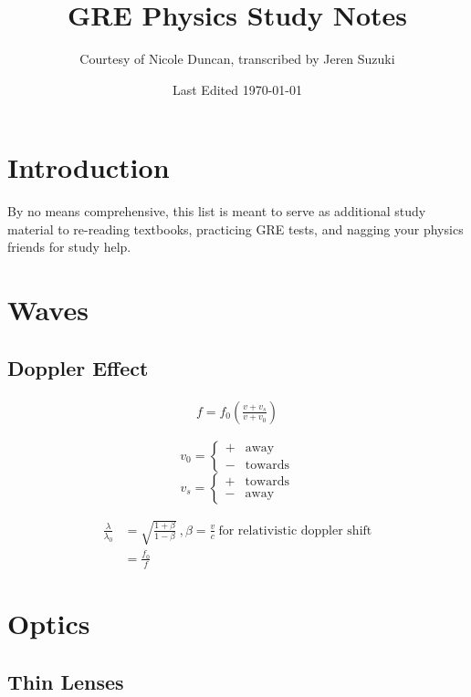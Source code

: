 \documentclass[10pt,letter]{article}
\title{GRE Physics Study Notes}
\author{Courtesy of Nicole Duncan, transcribed by Jeren Suzuki}
\date{Last Edited \today}
\begin{document}
\maketitle
{}
\newpage
\tableofcontents
\newpage
{}


\section*{Introduction}
By no means comprehensive, this list is meant to serve as additional study material to re-reading textbooks, practicing GRE tests, and nagging your physics friends for study help.


\section{Waves}
\subsection{Doppler Effect}

\begin{align}
    f = f_0 \left( \frac{v + v_s}{v + v_0} \right)
\end{align}

\[
 v_0 =
  \begin{cases}
   + & \textrm{away} \\
   - & \textrm{towards}
  \end{cases}
\]
\[
 v_s =
  \begin{cases}
   + & \textrm{towards} \\
   - & \textrm{away}
  \end{cases}
\]

\begin{align}
\frac{\lambda}{\lambda_0} &= \sqrt{\frac{1+\beta}{1- \beta}}~,\beta = \frac{v}{c}~ \textrm{for relativistic doppler shift}\\
&= \frac{f_0}{f}
\end{align}


\section{Optics}
\subsection{Thin Lenses}
\end{document}
